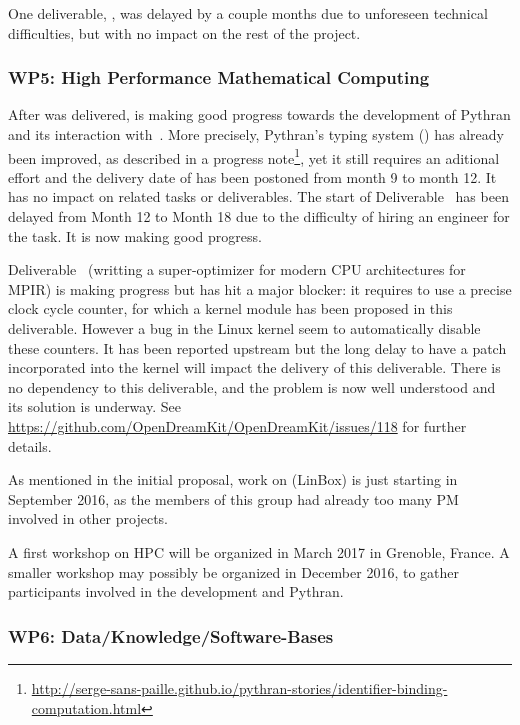 \documentclass{deliverablereport}
\begin{document}
One deliverable, , was delayed by a
couple months due to unforeseen technical difficulties, but with no
impact on the rest of the project.

\subsubsection{WP5: High Performance Mathematical Computing}

After  was delivered,  is making good progress towards the development of Pythran and its
interaction with~\Sage.
More precisely, Pythran's typing system () has already been improved, as described
in a progress note\footnote{\url{http://serge-sans-paille.github.io/pythran-stories/identifier-binding-computation.html}},
yet it still requires an aditional effort and the delivery date of
 has been postoned from month 9 to month 12. It
has no impact on related tasks or
deliverables. The start of Deliverable~ has been
delayed from Month 12 to Month 18 due to the difficulty of hiring an engineer for the task. It is now
making good progress.

Deliverable~ (writting a super-optimizer for modern CPU
architectures for MPIR) is making progress but has hit a major blocker: it
requires to use a precise clock cycle counter, for which a kernel module has been
proposed in this deliverable. However a bug in the Linux kernel seem to
automatically disable these counters. It has been reported upstream but the long
delay to have a patch incorporated into the kernel will impact the delivery of
this deliverable. There is no dependency to this deliverable, and the problem is
now well understood and its solution is underway. See
\url{https://github.com/OpenDreamKit/OpenDreamKit/issues/118} for further details.

As mentioned in the initial proposal, work on  (LinBox) is just
starting in September 2016, as the members of this group had already too many PM
involved in other projects.

A first workshop on HPC will be organized in March 2017 in Grenoble, France. A
smaller workshop may possibly be organized in December 2016, to gather
participants involved in the development and Pythran.


\subsubsection{WP6: Data/Knowledge/Software-Bases }
\end{document}
